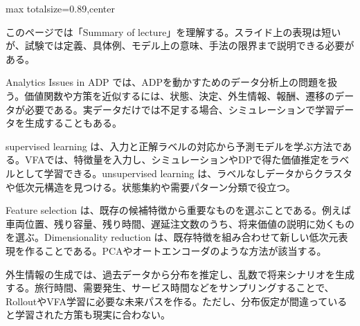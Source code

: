 \begin{minipage}[t]{0.58\textwidth}
\begin{adjustbox}{max totalsize={\textwidth}{0.89\textheight},center}
\begin{minipage}{\textwidth}\scriptsize
{}このページでは「Summary of lecture」を理解する。スライド上の表現は短いが、試験では定義、具体例、モデル上の意味、手法の限界まで説明できる必要がある。\par
Analytics Issues in ADP では、ADPを動かすためのデータ分析上の問題を扱う。価値関数や方策を近似するには、状態、決定、外生情報、報酬、遷移のデータが必要である。実データだけでは不足する場合、シミュレーションで学習データを生成することもある。\par
supervised learning は、入力と正解ラベルの対応から予測モデルを学ぶ方法である。VFAでは、特徴量を入力し、シミュレーションやDPで得た価値推定をラベルとして学習できる。unsupervised learning は、ラベルなしデータからクラスタや低次元構造を見つける。状態集約や需要パターン分類で役立つ。\par
Feature selection は、既存の候補特徴から重要なものを選ぶことである。例えば車両位置、残り容量、残り時間、遅延注文数のうち、将来価値の説明に効くものを選ぶ。Dimensionality reduction は、既存特徴を組み合わせて新しい低次元表現を作ることである。PCAやオートエンコーダのような方法が該当する。\par
外生情報の生成では、過去データから分布を推定し、乱数で将来シナリオを生成する。旅行時間、需要発生、サービス時間などをサンプリングすることで、RolloutやVFA学習に必要な未来パスを作る。ただし、分布仮定が間違っていると学習された方策も現実に合わない。\par

\end{minipage}
\end{adjustbox}
\end{minipage}
